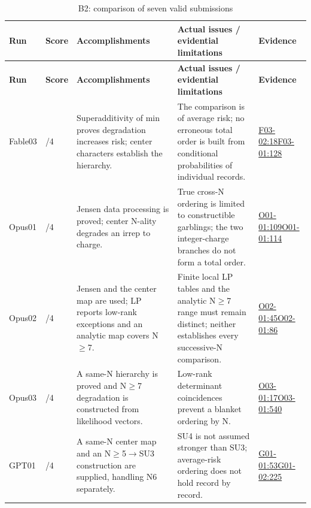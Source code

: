 \documentclass[11pt,a4paper]{article}
\begin{document}
{\fontsize{9.0}{12.6}\selectfont
\setlength{\tabcolsep}{2.5pt}
\begin{longtable}{>{\raggedright\arraybackslash}p{}>{\raggedright\arraybackslash}p{}>{\raggedright\arraybackslash}p{}>{\raggedright\arraybackslash}p{}>{\raggedright\arraybackslash}p{}}
\caption{B2: comparison of seven valid submissions}\\
\toprule
\textbf{Run} & \textbf{Score} & \textbf{Accomplishments} & \textbf{Actual issues /\allowbreak{} evidential limitations} & \textbf{Evidence}\tabularnewline
\midrule
\endfirsthead
\toprule
\textbf{Run} & \textbf{Score} & \textbf{Accomplishments} & \textbf{Actual issues /\allowbreak{} evidential limitations} & \textbf{Evidence}\tabularnewline
\midrule
\endhead
{}Fable03 & 4/\allowbreak{}4 & Superadditivity of min proves degradation increases risk; center characters establish the hierarchy. & The comparison is of average risk; no erroneous total order is built from conditional probabilities of individual records. & \hyperref[src:F03-02]{F03-02:18}\newline \hyperref[src:F03-01]{F03-01:128}\tabularnewline
{}Opus01 & 4/\allowbreak{}4 & Jensen data processing is proved; center N-ality degrades an irrep to charge. & True cross-N ordering is limited to constructible garblings; the two integer-charge branches do not form a total order. & \hyperref[src:O01-01]{O01-01:109}\newline \hyperref[src:O01-01]{O01-01:114}\tabularnewline
{}Opus02 & 4/\allowbreak{}4 & Jensen and the center map are used; LP reports low-rank exceptions and an analytic map covers N\ensuremath{\geq}7. & Finite local LP tables and the analytic N\ensuremath{\geq}7 range must remain distinct; neither establishes every successive-N comparison. & \hyperref[src:O02-01]{O02-01:45}\newline \hyperref[src:O02-01]{O02-01:86}\tabularnewline
{}Opus03 & 4/\allowbreak{}4 & A same-N hierarchy is proved and N\ensuremath{\geq}7 degradation is constructed from likelihood vectors. & Low-rank determinant coincidences prevent a blanket ordering by N. & \hyperref[src:O03-01]{O03-01:17}\newline \hyperref[src:O03-01]{O03-01:540}\tabularnewline
{}GPT01 & 4/\allowbreak{}4 & A same-N center map and an N\ensuremath{\geq}5\ensuremath{\rightarrow}SU3 construction are supplied,\allowbreak{} handling N6 separately. & SU4 is not assumed stronger than SU3; average-risk ordering does not hold record by record. & \hyperref[src:G01-01]{G01-01:53}\newline \hyperref[src:G01-02]{G01-02:225}\tabularnewline

\end{longtable}}
\end{document}

